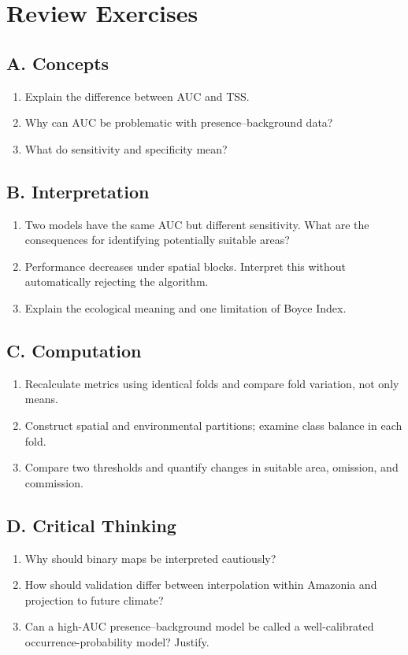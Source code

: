 \section{Review Exercises}
\subsection*{A. Concepts}
\begin{enumerate}
\item Explain the difference between AUC and TSS.
\item Why can AUC be problematic with presence--background data?
\item What do sensitivity and specificity mean?
\end{enumerate}
\subsection*{B. Interpretation}
\begin{enumerate}[resume]
\item Two models have the same AUC but different sensitivity. What are the consequences for identifying potentially suitable areas?
\item Performance decreases under spatial blocks. Interpret this without automatically rejecting the algorithm.
\item Explain the ecological meaning and one limitation of Boyce Index.
\end{enumerate}
\subsection*{C. Computation}
\begin{enumerate}[resume]
\item Recalculate metrics using identical folds and compare fold variation, not only means.
\item Construct spatial and environmental partitions; examine class balance in each fold.
\item Compare two thresholds and quantify changes in suitable area, omission, and commission.
\end{enumerate}
\subsection*{D. Critical Thinking}
\begin{enumerate}[resume]
\item Why should binary maps be interpreted cautiously?
\item How should validation differ between interpolation within Amazonia and projection to future climate?
\item Can a high-AUC presence--background model be called a well-calibrated occurrence-probability model? Justify.
\end{enumerate}

